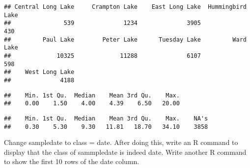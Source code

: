 \documentclass[]{article}
\newenvironment{Shaded}{\begin{snugshade}}{\end{snugshade}}
\newcommand{\KeywordTok}[1]{\textcolor[rgb]{0.13,0.29,0.53}{\textbf{#1}}}
\newcommand{\DataTypeTok}[1]{\textcolor[rgb]{0.13,0.29,0.53}{#1}}
\newcommand{\StringTok}[1]{\textcolor[rgb]{0.31,0.60,0.02}{#1}}
\newcommand{\CommentTok}[1]{\textcolor[rgb]{0.56,0.35,0.01}{\textit{#1}}}
\newcommand{\OperatorTok}[1]{\textcolor[rgb]{0.81,0.36,0.00}{\textbf{#1}}}
\newcommand{\NormalTok}[1]{#1}
\begin{document}
\begin{verbatim}
## Central Long Lake     Crampton Lake    East Long Lake  Hummingbird Lake 
##               539              1234              3905               430 
##         Paul Lake        Peter Lake      Tuesday Lake         Ward Lake 
##             10325             11288              6107               598 
##    West Long Lake 
##              4188
\end{verbatim}

\begin{Shaded}
\end{Shaded}

\begin{verbatim}
##    Min. 1st Qu.  Median    Mean 3rd Qu.    Max. 
##    0.00    1.50    4.00    4.39    6.50   20.00
\end{verbatim}

\begin{Shaded}
\end{Shaded}

\begin{verbatim}
##    Min. 1st Qu.  Median    Mean 3rd Qu.    Max.    NA's 
##    0.30    5.30    9.30   11.81   18.70   34.10    3858
\end{verbatim}

Change sampledate to class = date. After doing this, write an R command
to display that the class of sammpledate is indeed date. Write another R
command to show the first 10 rows of the date column.

\begin{Shaded}
\end{Shaded}
\end{document}
